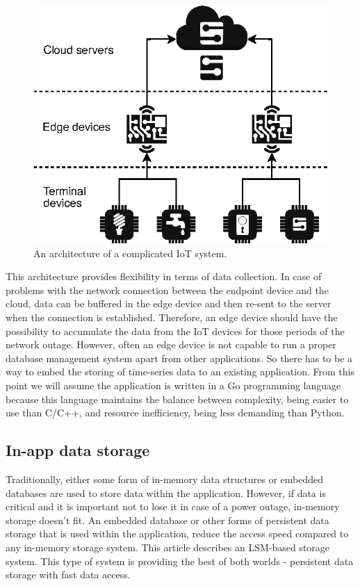 \begin{figure}[htb]
\centering
\includegraphics{figures/iot-hierarchy.drawio.eps}
\caption{An architecture of a complicated IoT system.} \label{fig1}
\end{figure}

This architecture provides flexibility in terms of data collection.
In case of problems with the network connection between the endpoint device and the cloud, data can be buffered in the edge device and then re-sent to the server when the connection is established. Therefore, an edge device should have the possibility to accumulate the data from the IoT devices for those periods of the network outage. However, often an edge device is not capable to run a proper database management system apart from other applications. So there has to be a way to embed the storing of time-series data to an existing application. From this point we will assume the application is written in a Go programming language because this language maintains the balance between complexity, being easier to use than C/C++, and resource inefficiency, being less demanding than Python.

\subsection{In-app data storage}
Traditionally, either some form of in-memory data structures or embedded databases are used to store data within the application. However, if data is critical and it is important not to lose it in case of a power outage, in-memory storage doesn't fit. An embedded database or other forms of persistent data storage that is used within the application, reduce the access speed compared to any in-memory storage system. This article describes an LSM-based storage system. This type of system is providing the best of both worlds - persistent data storage with fast data access.